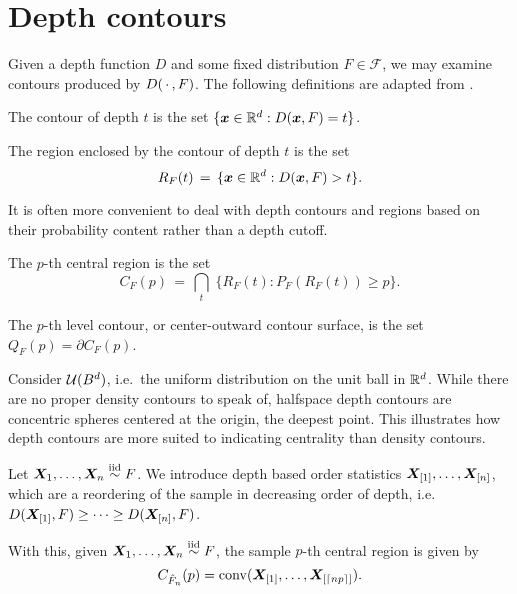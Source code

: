 \section{Depth contours}
\label{sec:multivariate_depthcontours}

Given a depth function $D$ and some fixed distribution $F \in \mathscr{F}$, we
may examine contours produced by $D(\,\cdot\,, F)$.
The following definitions are adapted from \cite{liu-parelius-singh-1999}.

\begin{definition}
    The contour of depth $t$ is the set $\{\bm{x} \in \mathbb{R}^d : D(\bm{x}, F) = t\}$.
\end{definition}

\begin{definition}
    The region enclosed by the contour of depth $t$ is the set
    \begin{equation}
        R_F(t) \,=\, \{\bm{x} \in \mathbb{R}^d : D(\bm{x}, F) > t\}.
    \end{equation}
\end{definition}

It is often more convenient to deal with depth contours and regions based on
their probability content rather than a depth cutoff.

\begin{definition}
    The $p$-th central region is the set
    \begin{equation}
        C_F(p) \,=\, \bigcap_{t}\; \{R_F(t) : P_F(R_F(t)) \geq p\}.
    \end{equation}
\end{definition}

\begin{definition}
    The $p$-th level contour, or center-outward contour surface, is the set
    $Q_F(p) = \partial C_F(p)$.
\end{definition}


\begin{example}
    Consider $\mathcal{U}(B^d)$, i.e.\ the uniform distribution on the unit ball in
    $\mathbb{R}^d$.
    While there are no proper density contours to speak of, halfspace depth
    contours are concentric spheres centered at the origin, the deepest point.
    This illustrates how depth contours are more suited to indicating
    centrality than density contours.
\end{example}


\begin{definition}
    Let $\bm{X}_1, \dots, \bm{X}_n \overset{\text{iid}}{\sim} F$.
    We introduce depth based order statistics $\bm{X}_{[1]}, \dots, \bm{X}_{[n]}$,
    which are a reordering of the sample in decreasing order of depth, i.e.\
    $D(\bm{X}_{[1]}, F) \geq \dots \geq D(\bm{X}_{[n]}, F)$.
\end{definition}

With this, given $\bm{X}_1, \dots, \bm{X}_n \overset{\text{iid}}{\sim} F$, the sample $p$-th central
region is given by
\begin{equation}
    C_{\hat{F}_n}(p) = \operatorname{conv}(\bm{X}_{[1]}, \dots, \bm{X}_{[\lceil np \rceil]}).
\end{equation}
